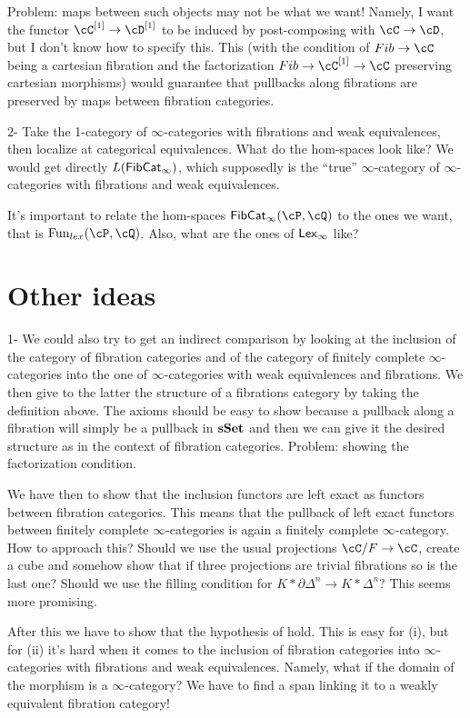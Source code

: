 \documentclass[a4paper,12pt,openany]{scrartcl}
\begin{document}
Problem: maps between such objects may not be what we want! Namely, I want the
functor $\cC^{[1]}\rightarrow\cD^{[1]}$ to be induced by post-composing with
$\cC\rightarrow\cD$, but I don't know how to specify this. This (with the
condition of $Fib\rightarrow\cC$ being a cartesian fibration and the
factorization $Fib\rightarrow\cC^{[1]}\rightarrow\cC$ preserving cartesian
morphisms) would guarantee that pullbacks along fibrations are preserved by maps
between fibration categories.

2- Take the 1-category of $\infty$-categories with fibrations and weak
equivalences, then localize at categorical equivalences. What do the hom-spaces
look like? We would get directly $L(\operatorname{\mathsf{FibCat}}_\infty)$, which supposedly is the
``true'' $\infty$-category of $\infty$-categories with fibrations and weak
equivalences.

It's important to relate the hom-spaces $\FibCat_\infty(\cP,\cQ)$ to the ones we
want, that is $\Fun_{lex}(\cP,\cQ)$. Also, what are the ones of $\operatorname{\mathsf{Lex}_\infty}$ like?

\section{Other ideas}

1- We could also try to get an indirect comparison by looking at the inclusion of the category of fibration categories and of the category of finitely complete $\infty$-categories into the one of $\infty$-categories with weak equivalences and fibrations. We then give to the latter the structure of a fibrations category by taking the definition above. The axioms should be easy to show because a pullback along a fibration will simply be a pullback in $\operatorname{\mathbf{sSet}}$ and then we can give it the desired structure as in the context of fibration categories. Problem: showing the factorization condition.

We have then to show that the inclusion functors are left exact as functors between fibration categories. This means that the pullback of left exact functors between finitely complete $\infty$-categories is again a finitely complete $\infty$-category. How to approach this? Should we use the usual projections $\cC/F\rightarrow\cC$, create a cube and somehow show that if three projections are trivial fibrations so is the last one? Should we use the filling condition for $K*\partial\Delta^n\rightarrow K*\Delta^n$? This seems more promising.

After this we have to show that the hypothesis of \cite[Thm.\ 7.6.25]{Cis19} hold. This is easy for (i), but for (ii) it's hard when it comes to the inclusion of fibration categories into $\infty$-categories with fibrations and weak equivalences. Namely, what if the domain of the morphism is a $\infty$-category? We have to find a span linking it to a weakly equivalent fibration category!
\end{document}
